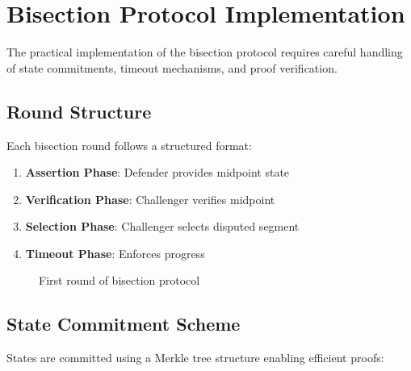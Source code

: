\documentclass[11pt,a4paper]{article}
\theoremstyle{definition}
\begin{document}
\section{Bisection Protocol Implementation}

The practical implementation of the bisection protocol requires careful handling of state commitments, timeout mechanisms, and proof verification.

\subsection{Round Structure}

Each bisection round follows a structured format:

\begin{enumerate}
    \item \textbf{Assertion Phase}: Defender provides midpoint state
    \item \textbf{Verification Phase}: Challenger verifies midpoint
    \item \textbf{Selection Phase}: Challenger selects disputed segment
    \item \textbf{Timeout Phase}: Enforces progress
\end{enumerate}

\begin{figure}[h]
\centering
{}
\caption{First round of bisection protocol}
\end{figure}

\subsection{State Commitment Scheme}

States are committed using a Merkle tree structure enabling efficient proofs:
\end{document}
